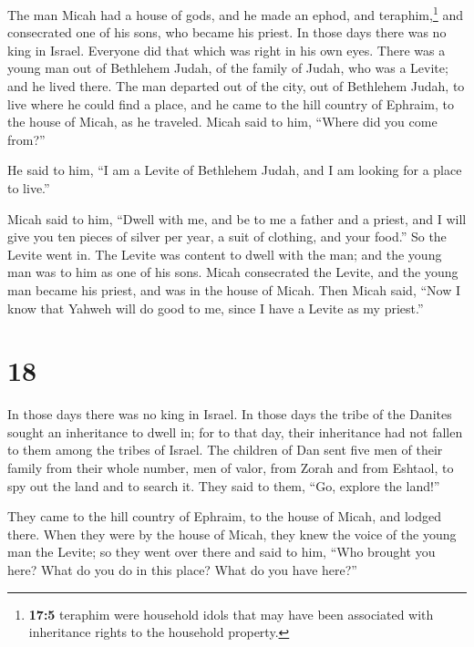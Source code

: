  The man Micah had a house of gods, and he made an ephod,
and teraphim,\footnote{\textbf{17:5} teraphim were household idols that
  may have been associated with inheritance rights to the household
  property.} and consecrated one of his sons, who became his priest.
 In those days there was no king in Israel. Everyone did
that which was right in his own eyes.  There was a young
man out of Bethlehem Judah, of the family of Judah, who was a Levite;
and he lived there.  The man departed out of the city, out
of Bethlehem Judah, to live where he could find a place, and he came to
the hill country of Ephraim, to the house of Micah, as he traveled.
 Micah said to him, ``Where did you come from?''

He said to him, ``I am a Levite of Bethlehem Judah, and I am looking for
a place to live.''

 Micah said to him, ``Dwell with me, and be to me a
father and a priest, and I will give you ten pieces of silver per year,
a suit of clothing, and your food.'' So the Levite went in.
 The Levite was content to dwell with the man; and the
young man was to him as one of his sons.  Micah
consecrated the Levite, and the young man became his priest, and was in
the house of Micah.  Then Micah said, ``Now I know that
Yahweh will do good to me, since I have a Levite as my priest.''

\hypertarget{section-17}{%
\section{18}\label{section-17}}

 In those days there was no king in Israel. In those days
the tribe of the Danites sought an inheritance to dwell in; for to that
day, their inheritance had not fallen to them among the tribes of
Israel.  The children of Dan sent five men of their family
from their whole number, men of valor, from Zorah and from Eshtaol, to
spy out the land and to search it. They said to them, ``Go, explore the
land!''

They came to the hill country of Ephraim, to the house of Micah, and
lodged there.  When they were by the house of Micah, they
knew the voice of the young man the Levite; so they went over there and
said to him, ``Who brought you here? What do you do in this place? What
do you have here?''


